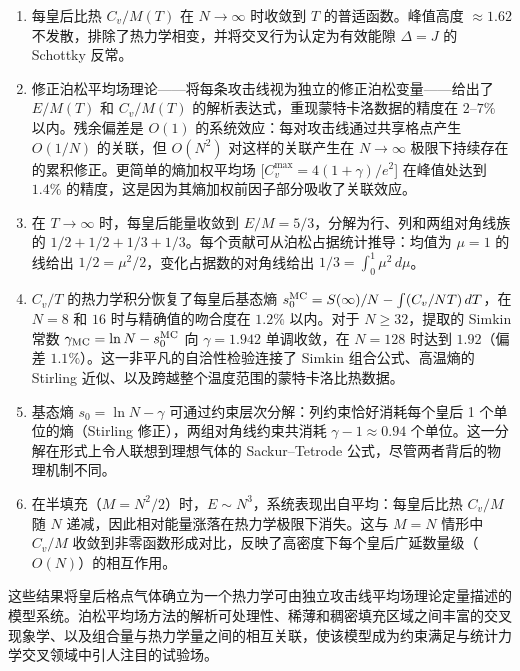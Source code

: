 \documentclass[aps, pre, reprint, amsmath, amssymb, superscriptaddress, floatfix]{revtex4-2}
\begin{document}
\begin{enumerate}
\item 每皇后比热 $C_v/M(T)$ 在 $N \to \infty$ 时收敛到 $T$ 的普适函数。峰值高度 $\approx 1.62$ 不发散，排除了热力学相变，并将交叉行为认定为有效能隙 $\Delta = J$ 的 Schottky 反常。

\item 修正泊松平均场理论——将每条攻击线视为独立的修正泊松变量——给出了 $E/M(T)$ 和 $C_v/M(T)$ 的解析表达式，重现蒙特卡洛数据的精度在 $2$--$7\%$ 以内。残余偏差是 $O(1)$ 的系统效应：每对攻击线通过共享格点产生 $O(1/N)$ 的关联，但 $O(N^2)$ 对这样的关联产生在 $N \to \infty$ 极限下持续存在的累积修正。更简单的熵加权平均场 [$C_v^{\max} = 4(1+\gamma)/e^2$] 在峰值处达到 $1.4\%$ 的精度，这是因为其熵加权前因子部分吸收了关联效应。

\item 在 $T \to \infty$ 时，每皇后能量收敛到 $E/M = 5/3$，分解为行、列和两组对角线族的 $1/2 + 1/2 + 1/3 + 1/3$。每个贡献可从泊松占据统计推导：均值为 $\mu = 1$ 的线给出 $1/2 = \mu^2/2$，变化占据数的对角线给出 $1/3 = \int_0^1 \mu^2\,d\mu$。

\item $C_v/T$ 的热力学积分恢复了每皇后基态熵 $s_0^{\rm MC} = S(\infty)/N - \int(C_v/NT)\,dT$，在 $N = 8$ 和 $16$ 时与精确值的吻合度在 $1.2\%$ 以内。对于 $N \ge 32$，提取的 Simkin 常数 $\gamma_{\rm MC} = \ln N - s_0^{\rm MC}$ 向 $\gamma = 1.942$ 单调收敛，在 $N = 128$ 时达到 $1.92$（偏差 $1.1\%$）。这一非平凡的自洽性检验连接了 Simkin 组合公式、高温熵的 Stirling 近似、以及跨越整个温度范围的蒙特卡洛比热数据。

\item 基态熵 $s_0 = \ln N - \gamma$ 可通过约束层次分解：列约束恰好消耗每个皇后 1 个单位的熵（Stirling 修正），两组对角线约束共消耗 $\gamma - 1 \approx 0.94$ 个单位。这一分解在形式上令人联想到理想气体的 Sackur--Tetrode 公式，尽管两者背后的物理机制不同。

\item 在半填充（$M = N^2/2$）时，$E \sim N^3$，系统表现出自平均：每皇后比热 $C_v/M$ 随 $N$ 递减，因此相对能量涨落在热力学极限下消失。这与 $M = N$ 情形中 $C_v/M$ 收敛到非零函数形成对比，反映了高密度下每个皇后广延数量级（$O(N)$）的相互作用。

\end{enumerate}

这些结果将皇后格点气体确立为一个热力学可由独立攻击线平均场理论定量描述的模型系统。泊松平均场方法的解析可处理性、稀薄和稠密填充区域之间丰富的交叉现象学、以及组合量与热力学量之间的相互关联，使该模型成为约束满足与统计力学交叉领域中引人注目的试验场。
\end{document}
